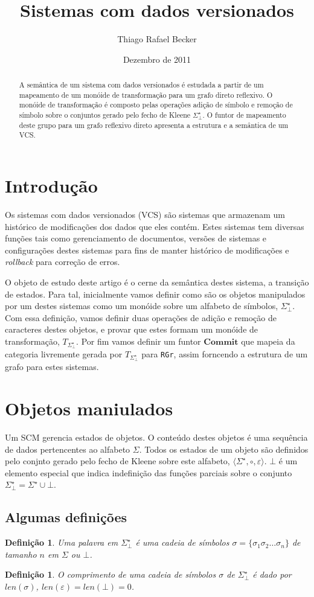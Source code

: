 \documentclass[a4paper]{article}
\title{Sistemas com dados versionados}
\author{Thiago Rafael Becker}
\date{Dezembro de 2011}
\newcommand{\baseset}{{\Sigma^\star_\bot}}
\newcommand{\transMon}{{T_\baseset}}
\newcommand{\composition}{{\circ}}
\newcommand{\len}[1]{{len(#1)}}
\newcommand{\commit}{{\mathbf{Commit}}}
\begin{document}
\maketitle
\begin{abstract}
A semântica de um sistema com dados versionados é estudada a partir de um mapeamento de um monóide de transformação para um grafo direto reflexivo. O monóide de transformação é composto pelas operações adição de símbolo e remoção de símbolo sobre o conjuntos gerado pelo fecho de Kleene $\baseset$. O funtor de mapeamento deste grupo para um grafo reflexivo direto apresenta a estrutura e a semântica de um VCS.
\end{abstract}

\section*{Introdução}
Os sistemas com dados versionados (VCS) são sistemas que armazenam um histórico de modificações dos dados que eles contém. Estes sistemas tem diversas funções tais como gerenciamento de documentos, versões de sistemas e configurações destes sistemas para fins de manter histórico de modificações e {\it rollback} para correção de erros.

O objeto de estudo deste artigo é o cerne da semântica destes sistema, a transição de estados. Para tal, inicialmente vamos definir como são os objetos manipulados por um destes sistemas como um monóide sobre um alfabeto de símbolos, $\baseset$. Com essa definição, vamos definir duas operações de adição e remoção de caracteres destes objetos, e provar que estes formam um monóide de transformação, $\transMon$. Por fim vamos definir um funtor $\commit$ que mapeia da categoria livremente gerada por $\transMon$ para {\tt RGr}, assim forncendo a estrutura de um grafo para estes sistemas.

\section*{Objetos maniulados} \label{sec:intuitiva}
Um SCM gerencia estados de objetos. O conteúdo destes objetos é uma sequência de dados pertencentes ao alfabeto $\Sigma$. Todos os estados de um objeto são definidos pelo conjnto gerado pelo fecho de Kleene sobre este alfabeto, $\langle\Sigma^\star, \composition, \varepsilon\rangle$. $\bot$ é um elemento especial que indica indefinição das funções parciais sobre o conjunto $\baseset = \Sigma^\star \cup \bot$.

\subsection*{Algumas definições}
\newtheorem{mydef}[section]{Definição}
\begin{mydef}
Uma {\it palavra} em $\baseset$ é uma cadeia de símbolos $\sigma = \{\sigma_1\sigma_2\ldots\sigma_n\}$ de tamanho $n$ em $\Sigma$ ou $\bot$.
\end{mydef}
\begin{mydef}
O comprimento de uma cadeia de símbolos $\sigma$ de $\baseset$ é dado por $\len{\sigma}$, $\len{\varepsilon} = \len{\bot} = 0$.
\end{mydef} 
\end{document}

